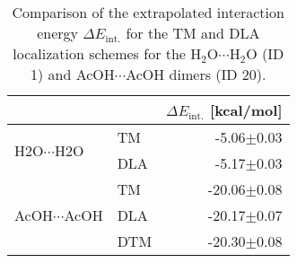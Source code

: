 \begin{table}
\caption{\label{tab:loc_scheme_test}Comparison of the extrapolated interaction energy $\Delta E_\text{int.}$ for the TM and DLA localization schemes for the H$_2$O$\cdots$H$_2$O (ID 1) and AcOH$\cdots$AcOH dimers (ID 20).}
\begin{adjustbox}{center}
\begin{tabular}{llr}
\toprule
 &  & $\Delta E_\text{int.}$ [kcal/mol] \\ 
\midrule
\multirow[t]{2}{*}{H2O$\cdots$H2O} & TM & -5.06$\pm$0.03 \\
 & DLA & -5.17$\pm$0.03 \\
\cline{1-3}
\multirow[t]{3}{*}{AcOH$\cdots$AcOH} & TM & -20.06$\pm$0.08 \\
 & DLA & -20.17$\pm$0.07 \\
 & DTM & -20.30$\pm$0.08 \\
\cline{1-3}
\bottomrule
\end{tabular}
\end{adjustbox}
\end{table}
